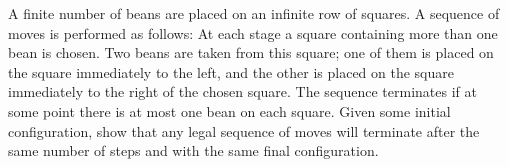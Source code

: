 A finite number of beans are placed on an infinite row of squares. A sequence of moves is performed as follows: At each stage a square containing more than one bean is chosen. Two beans are taken from this square; one of them is placed on the square immediately to the left, and the other is placed on the square immediately to the right of the chosen square. The sequence terminates if at some point there is at most one bean on each square. Given some initial configuration, show that any legal sequence of moves will terminate after the same number of steps and with the same final configuration.

